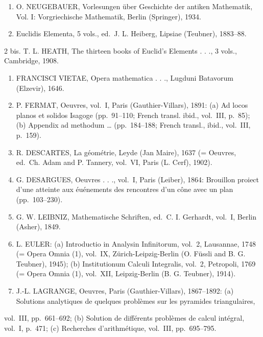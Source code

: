 
\begin{enumerate}
\def\labelenumi{\arabic{enumi}.}
\item
  O. NEUGEBAUER, Vorlesungen über Geschichte der antiken Mathematik, Vol. I: Vorgriechische Mathematik, Berlin (Springer), 1934.
\item
  Euclidis Elementa, 5 vols., ed.~J. L. Heiberg, Lipsiae (Teubner), 1883--88.
\end{enumerate}

2 bis. T. L. HEATH, The thirteen books of Euclid's Elements . . ., 3 vols., Cambridge, 1908.

\begin{enumerate}
\def\labelenumi{\arabic{enumi}.}
\setcounter{enumi}{2}
\item
  FRANCISCI VIETAE, Opera mathematica . . ., Lugduni Batavorum (Elzevir), 1646.
\item
  P. FERMAT, Oeuvres, vol.~I, Paris (Gauthier-Villars), 1891: (a) Ad locos planos et solidos Isagoge (pp.~91--110; French transl. ibid., vol.~III, p.~85); (b) Appendix ad methodum \ldots{} (pp.~184--188; French transl., ibid., vol.~III, p.~159).
\item
  R. DESCARTES, La géométrie, Leyde (Jan Maire), 1637 (= Oeuvres, ed.~Ch. Adam and P. Tannery, vol.~VI, Paris (L. Cerf), 1902).
\item
  G. DESARGUES, Oeuvres . . ., vol.~I, Paris (Leiber), 1864: Brouillon proiect d'une atteinte aux éuénements des rencontres d'un cône avec un plan (pp.~103--230).
\item
  G. W. LEIBNIZ, Mathematische Schriften, ed.~C. I. Gerhardt, vol.~I, Berlin (Asher), 1849.
\item
  L. EULER: (a) Introductio in Analysin Infinitorum, vol.~2, Lausannae, 1748 (= Opera Omnia (1), vol.~IX, Zürich-Leipzig-Berlin (O. Füssli and B. G. Teubner), 1945); (b) Institutionum Calculi Integralis, vol.~2, Petropoli, 1769 (= Opera Omnia (1), vol.~XII, Leipzig-Berlin (B. G. Teubner), 1914).
\item
  J.-L. LAGRANGE, Oeuvres, Paris (Gauthier-Villars), 1867--1892: (a) Solutions analytiques de quelques problèmes sur les pyramides triangulaires,
\end{enumerate}

vol.~III, pp.~661--692; (b) Solution de différents problèmes de calcul intégral, vol.~I, p.~471; (c) Recherches d'arithmétique, vol.~III, pp.~695--795.

